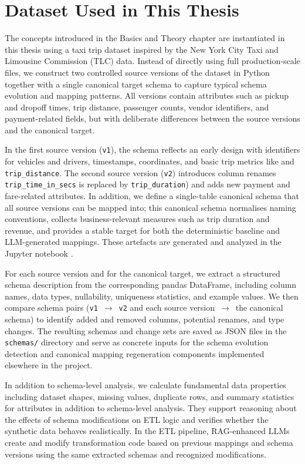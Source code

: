 \section{Dataset Used in This Thesis}
\label{sec:thesis-dataset}

The concepts introduced in the Basics and Theory chapter are instantiated in this thesis using a taxi trip dataset inspired by the New York City Taxi and Limousine Commission (TLC) data. Instead of directly using full production-scale files, we construct two controlled source versions of the dataset in Python together with a single canonical target schema to capture typical schema evolution and mapping patterns. All versions contain attributes such as pickup and dropoff times, trip distance, passenger counts, vendor identifiers, and payment-related fields, but with deliberate differences between the source versions and the canonical target.

In the first source version (\texttt{v1}), the schema reflects an early design with identifiers for vehicles and drivers, timestamps, coordinates, and basic trip metrics like  and \texttt{trip\_distance}. The second source version (\texttt{v2}) introduces column renames \texttt{trip\_time\_in\_secs} is replaced by \texttt{trip\_duration}) and adds new payment and fare-related attributes. In addition, we define a single-table canonical schema that all source versions can be mapped into; this canonical schema normalises naming conventions, collects business-relevant measures such as trip duration and revenue, and provides a stable target for both the deterministic baseline and LLM-generated mappings. These artefacts are generated and analyzed in the Jupyter notebook .


For each source version and for the canonical target, we extract a structured schema description from the corresponding pandas DataFrame, including column names, data types, nullability, uniqueness statistics, and example values. We then compare schema pairs (\texttt{v1}~$\rightarrow$~\texttt{v2} and each source version~$\rightarrow$~the canonical schema) to identify added and removed columns, potential renames, and type changes. The resulting schemas and change sets are saved as JSON files in the \texttt{schemas/} directory and serve as concrete inputs for the schema evolution detection and canonical mapping regeneration components implemented elsewhere in the project.

In addition to schema-level analysis, we calculate fundamental data properties including dataset shapes, missing values, duplicate rows, and summary statistics for attributes in addition to schema-level analysis. They support reasoning about the effects of schema modifications on ETL logic and verifies whether the synthetic data behaves realistically. In the ETL pipeline, RAG-enhanced LLMs create and modify transformation code based on previous mappings and schema versions using the same extracted schemas and recognized modifications.